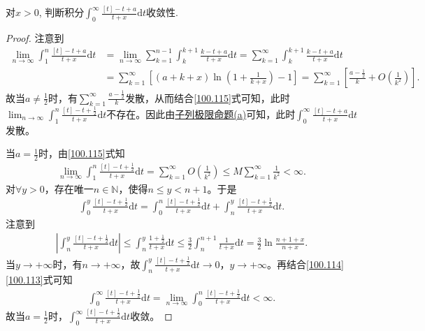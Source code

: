 \documentclass[../../main.tex]{subfiles}%
\begin{document}
\begin{example}
对$x > 0$, 判断积分$\int_0^{\infty} \frac{[t] - t + a}{t + x} \mathrm{d}t$收敛性.
\end{example}
\begin{proof}

注意到
\begin{align}
\lim_{n\to\infty}\int_1^n\frac{[t] - t + a}{t + x}\mathrm{d}t &= \lim_{n\to\infty}\sum_{k=1}^{n-1}\int_k^{k+1}\frac{k - t + a}{t + x}\mathrm{d}t = \sum_{k=1}^{\infty}\int_k^{k+1}\frac{k - t + a}{t + x}\mathrm{d}t\nonumber\\
&= \sum_{k=1}^{\infty}\left[(a + k + x)\ln\left(1 + \frac{1}{k + x}\right) - 1\right] = \sum_{k=1}^{\infty}\left[\frac{a - \frac{1}{2}}{k} + O\left(\frac{1}{k^2}\right)\right].\label{100.115}
\end{align}
故当$a \ne \frac{1}{2}$时，有$\sum_{k=1}^{\infty}\frac{a - \frac{1}{2}}{k}$发散，从而结合\eqref{100.115}式可知，此时$\lim_{n\to\infty}\int_1^n\frac{[t] - t + \frac{1}{2}}{t + x}\mathrm{d}t$不存在。因此由\hyperref[proposition:子列极限命题]{子列极限命题(a)}可知，此时$\int_0^{\infty}\frac{[t] - t + a}{t + x}\mathrm{d}t$发散。

当$a = \frac{1}{2}$时，由\eqref{100.115}式知
\begin{align}
\lim_{n\to\infty}\int_1^n\frac{[t] - t + \frac{1}{2}}{t + x}\mathrm{d}t = \sum_{k=1}^{\infty}O\left(\frac{1}{k^2}\right) \leqslant M\sum_{k=1}^{\infty}\frac{1}{k^2} < \infty.\label{100.114}
\end{align}
对$\forall y > 0$，存在唯一$n \in \mathbb{N}$，使得$n \leqslant y < n + 1$。于是
\begin{align}
\int_0^y\frac{[t] - t + \frac{1}{2}}{t + x}\mathrm{d}t = \int_0^n\frac{[t] - t + \frac{1}{2}}{t + x}\mathrm{d}t + \int_n^y\frac{[t] - t + \frac{1}{2}}{t + x}\mathrm{d}t.\label{100.113}
\end{align}
注意到
\begin{align*}
\left|\int_n^y\frac{[t] - t + \frac{1}{2}}{t + x}\mathrm{d}t\right| \leqslant \int_n^y\frac{1 + \frac{1}{2}}{t + x}\mathrm{d}t \leqslant \frac{3}{2}\int_n^{n+1}\frac{1}{t + x}\mathrm{d}t = \frac{3}{2}\ln\frac{n + 1 + x}{n + x}.
\end{align*}
当$y \to +\infty$时，有$n \to +\infty$，故$\int_n^y\frac{[t] - t + \frac{1}{2}}{t + x}\mathrm{d}t \to 0$，$y \to +\infty$。再结合\eqref{100.114}\eqref{100.113}式可知
\begin{align*}
\int_0^{\infty}\frac{[t] - t + \frac{1}{2}}{t + x}\mathrm{d}t = \lim_{n\to\infty}\int_0^n\frac{[t] - t + \frac{1}{2}}{t + x}\mathrm{d}t < \infty.
\end{align*}
故当$a = \frac{1}{2}$时，$\int_0^{\infty}\frac{[t] - t + \frac{1}{2}}{t + x}\mathrm{d}t$收敛。

\end{proof}
\end{document}
